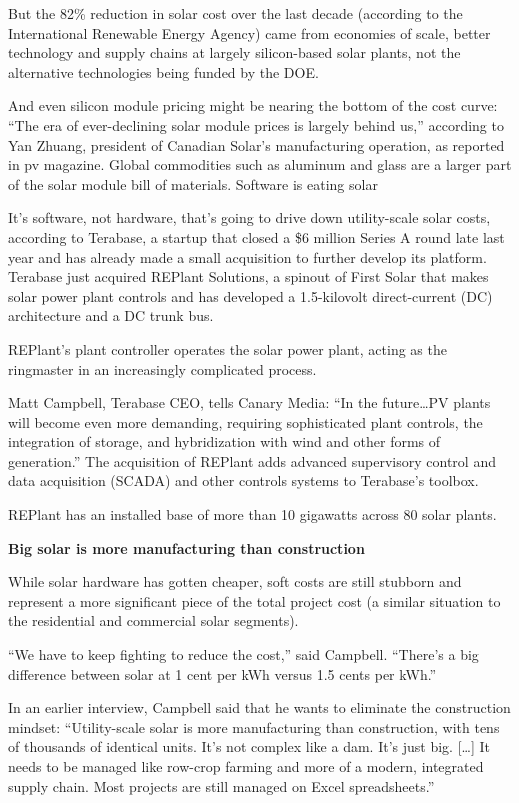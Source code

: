 \documentclass[
]{book}
\begin{document}
But the 82\% reduction in solar cost over the last decade (according to the International Renewable Energy Agency) came from economies of scale, better technology and supply chains at largely silicon-based solar plants, not the alternative technologies being funded by the DOE.

And even silicon module pricing might be nearing the bottom of the cost curve: ``The era of ever-declining solar module prices is largely behind us,'' according to Yan Zhuang, president of Canadian Solar's manufacturing operation, as reported in pv magazine. Global commodities such as aluminum and glass are a larger part of the solar module bill of materials.
Software is eating solar

It's software, not hardware, that's going to drive down utility-scale solar costs, according to Terabase, a startup that closed a \$6 million Series A round late last year and has already made a small acquisition to further develop its platform. Terabase just acquired REPlant Solutions, a spinout of First Solar that makes solar power plant controls and has developed a 1.5-kilovolt direct-current (DC) architecture and a DC trunk bus.

REPlant's plant controller operates the solar power plant, acting as the ringmaster in an increasingly complicated process.

Matt Campbell, Terabase CEO, tells Canary Media: ``In the future\ldots PV plants will become even more demanding, requiring sophisticated plant controls, the integration of storage, and hybridization with wind and other forms of generation.'' The acquisition of REPlant adds advanced supervisory control and data acquisition (SCADA) and other controls systems to Terabase's toolbox.

REPlant has an installed base of more than 10 gigawatts across 80 solar plants.

\textbf{Big solar is more manufacturing than construction}

While solar hardware has gotten cheaper, soft costs are still stubborn and represent a more significant piece of the total project cost (a similar situation to the residential and commercial solar segments).

``We have to keep fighting to reduce the cost,'' said Campbell. ``There's a big difference between solar at 1 cent per kWh versus 1.5 cents per kWh.''

In an earlier interview, Campbell said that he wants to eliminate the construction mindset: ``Utility-scale solar is more manufacturing than construction, with tens of thousands of identical units. It's not complex like a dam. It's just big. {[}\ldots{]} It needs to be managed like row-crop farming and more of a modern, integrated supply chain. Most projects are still managed on Excel spreadsheets.''
\end{document}
